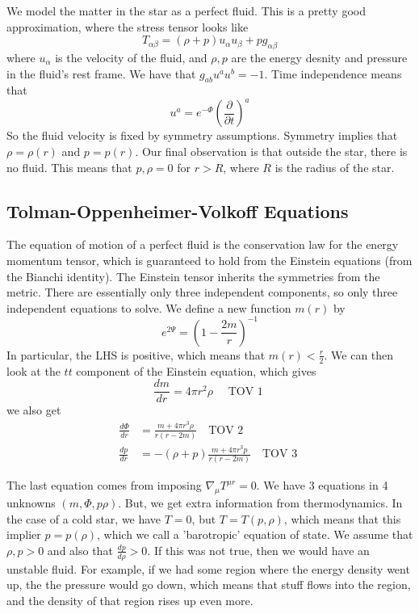 \documentclass[11pt, oneside]{article}   	%
\theoremstyle{slanted}
\begin{document}
We model the matter in the star 
as a perfect fluid. This is a pretty good approximation, 
where the stress tensor looks like 
\[
T _{ \alpha \beta  }  = \left( \rho  + p  \right)  u _ \alpha u _ \beta 
+ p g _{ \alpha \beta }
\]  where $ u _ \alpha $ is the velocity of the fluid, and $ \rho , p $ are
the energy desnity and pressure in the fluid's rest frame. 
We have that $ g _{ ab } u ^ a u ^ b  = - 1$. 
Time independence means that 
\[
u ^ a  = e ^{  - \Phi } \left( \frac{\partial  }{\partial  t }   \right)  ^ a 
\] So the fluid velocity is fixed by 
symmetry assumptions. 
Symmetry implies that $ \rho  = \rho ( r ) $ and 
$ p = p ( r  ) $. 
Our final observation is 
that outside the star, there is no fluid. 
This means that $ p , \rho   = 0 $ for $ r > R $, 
where $ R $ is the radius of the star. 

\subsection{Tolman-Oppenheimer-Volkoff Equations}
The equation of motion of a perfect fluid 
is the conservation law for the energy momentum tensor, 
which is guaranteed to hold from the Einstein equations 
(from the Bianchi identity). The Einstein tensor inherits 
the symmetries from the metric. 
There are essentially only three independent 
components, so only three independent equations 
to solve. 
We define a new function $ m ( r ) $ by 
\[
e ^{ 2 \Psi }  = \left( 1 - \frac{2m}{r }  \right) ^{ - 1 }
\] In particular, the LHS is positive, which means that 
$ m ( r ) < \frac{r}{2 } $. 
We can then look at the $ t t $ component of the Einstein equation, 
which gives 
\[
\frac{d m }{ dr }  = 4 \pi r ^ 2 \rho \quad \text{ TOV 1 }
\] we also get 
\begin{align*}
\frac{ d \Phi }{ dr } &=  \frac{ m + 4 \pi  r^  3 \rho }{ r ( r - 2m ) } \quad 
\text{TOV 2 }\\
\frac{dp  }{dr } & = - \left( \rho + p  \right)  
\frac{ m + 4 \pi r ^ 3 p }{ r \left( r - 2m  \right)  } \quad \text{TOV 3 }
\end{align*}

The last equation comes from imposing $ \nabla _ \mu T ^{ \mu r }  = 0 $. 
We have 3 equations in 4 unknowns 
$ \left( m , \Phi , p \rho  \right)  $. 
But, we get extra information from 
thermodynamics. 
In the case of a cold star, we have $ T = 0 $, 
but $ T = T \left( p , \rho  \right)  $, which 
means that this implier $ p = p \left( \rho   \right) $, 
which we call a 'barotropic' equation of state. 
We assume that $ \rho , p > 0 $ and also that 
$ \frac{ d p }{ d \rho } > 0 $. If this was not true, 
then we would have an unstable fluid. 
For example, if we had some region where 
the energy density went up, the the pressure would go down, 
which means that stuff flows into the region, and the density 
of that region rises up even more. 
\end{document}
